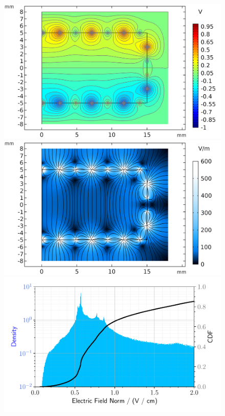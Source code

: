 \begin{figure}
\begin{minipage}{0.49\textwidth}
\end{minipage}
\hfill\vline\hfill
\begin{minipage}{0.49\textwidth}
\centering
\includegraphics[scale=0.5]{Figures/Electrodes/fid38_potential.png}
\includegraphics[scale=0.5]{Figures/Electrodes/fid38_enorm.png}
\includegraphics[scale=0.5]{Figures/Electrodes/fid38_enorm_hist.pdf}

\end{minipage}
\end{figure}
